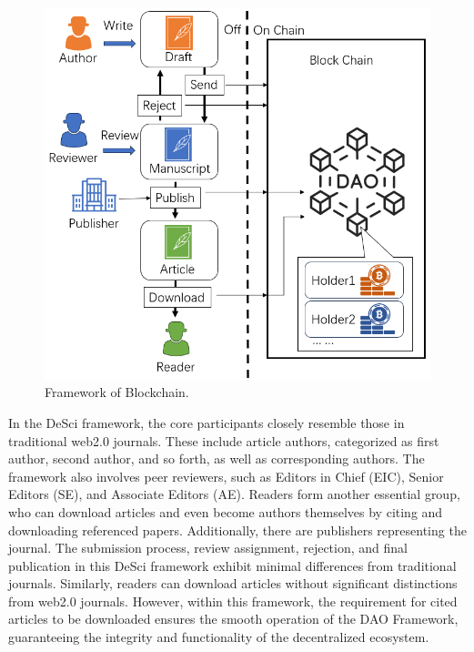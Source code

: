 \documentclass[lettersize,journal]{IEEEtran}
\begin{document}
\begin{figure}[h!]
  \centering
  \includegraphics[width=\linewidth]{assets/workflow.png}
  \caption{Framework of Blockchain.}
  \label{fig:frameworkofblockchain}
\end{figure}


In the DeSci framework, the core participants closely resemble those in traditional web2.0 journals. These include article authors, categorized as first author, second author, and so forth, as well as corresponding authors. The framework also involves peer reviewers, such as Editors in Chief (EIC), Senior Editors (SE), and Associate Editors (AE). Readers form another essential group, who can download articles and even become authors themselves by citing and downloading referenced papers. Additionally, there are publishers representing the journal.
The submission process, review assignment, rejection, and final publication in this DeSci framework exhibit minimal differences from traditional journals. Similarly, readers can download articles without significant distinctions from web2.0 journals. However, within this framework, the requirement for cited articles to be downloaded ensures the smooth operation of the DAO Framework, guaranteeing the integrity and functionality of the decentralized ecosystem.
\end{document}
